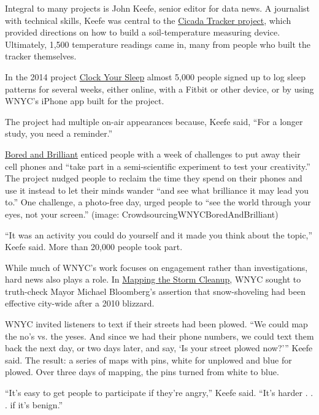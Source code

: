 \begin{itemize}
\begin{itemize}
Integral to many projects is John Keefe, senior editor for data news. A journalist with technical skills, Keefe was central to the \href{http://project.wnyc.org/cicadas/}{Cicada Tracker project}, which provided directions on how to build a soil-temperature measuring device.\autocite{Cicadas} Ultimately, 1,500 temperature readings came in, many from people who built the tracker themselves.\autocite{Keefe}

In the 2014 project \href{http://www.wnyc.org/story/clock-your-sleep-findings/}{Clock Your Sleep}\autocite{Sleep} almost 5,000 people signed up to log sleep patterns for several weeks, either online, with a Fitbit or other device, or by using WNYC’s iPhone app built for the project. 

The project had multiple on-air appearances because, Keefe said, ``For a longer study, you need a reminder.''

\href{http://www.wnyc.org/series/bored-and-brilliant/}{Bored and Brilliant}\autocite{Bored} enticed people with a week of challenges to put away their cell phones and ``take part in a semi-scientific experiment to test your creativity.'' The project nudged people to reclaim the time they spend on their phones and use it instead to let their minds wander ``and see what brilliance it may lead you to.” One challenge, a photo-free day, urged people to “see the world through your eyes, not your screen.'' (image: CrowdsourcingWNYCBoredAndBrilliant)

``It was an activity you could do yourself and it made you think about the topic,'' Keefe said. More than 20,000 people took part.

While much of WNYC’s work focuses on engagement rather than investigations, hard news also plays a role. In \href{http://www.wnyc.org/story/105548-2-mapping-storm-clean-/}{Mapping the Storm Cleanup}, WNYC sought to truth-check Mayor Michael Bloomberg’s assertion that snow-shoveling had been effective city-wide after a 2010 blizzard.\autocite{Storm} 

WNYC invited listeners to text if their streets had been plowed. ``We could map the no’s vs. the yeses. And since we had their phone numbers, we could text them back the next day, or two days later, and say, ‘Is your street plowed now?’'' Keefe said. The result: a series of maps with pins, white for unplowed and blue for plowed. Over three days of mapping, the pins turned from white to blue. 

``It’s easy to get people to participate if they’re angry,'' Keefe said. ``It’s harder . . . if it’s benign.''


\end{itemize}
\end{itemize}
